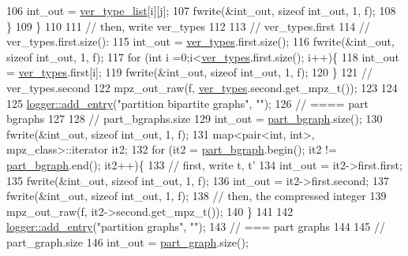 \begin{DoxyCode}
106       int\_out = \hyperlink{classmarked__graph__compressed_af2e3e55223d436628a02758dfae88493}{ver\_type\_list}[i][j];
107       fwrite(&int\_out, \textcolor{keyword}{sizeof} int\_out, 1, f);
108     \}
109   \}
110 
111   \textcolor{comment}{// then, write ver\_types}
112 
113   \textcolor{comment}{// ver\_types.first}
114   \textcolor{comment}{// ver\_types.first.size():}
115   int\_out = \hyperlink{classmarked__graph__compressed_af446cc5e23c241a92b76642fd5ebc403}{ver\_types}.first.size();
116   fwrite(&int\_out, \textcolor{keyword}{sizeof} int\_out, 1, f);
117   \textcolor{keywordflow}{for} (\textcolor{keywordtype}{int} i =0;i<\hyperlink{classmarked__graph__compressed_af446cc5e23c241a92b76642fd5ebc403}{ver\_types}.first.size(); i++)\{
118     int\_out = \hyperlink{classmarked__graph__compressed_af446cc5e23c241a92b76642fd5ebc403}{ver\_types}.first[i];
119     fwrite(&int\_out, \textcolor{keyword}{sizeof} int\_out, 1, f);
120   \}
121   \textcolor{comment}{// ver\_types.second}
122   mpz\_out\_raw(f, \hyperlink{classmarked__graph__compressed_af446cc5e23c241a92b76642fd5ebc403}{ver\_types}.second.get\_mpz\_t());
123 
124 
125   \hyperlink{classlogger_a710163deb17bc81f70d53d285b8ac9ac}{logger::add\_entry}(\textcolor{stringliteral}{"partition bipartite graphs"}, \textcolor{stringliteral}{""});
126   \textcolor{comment}{// ==== part bgraphs}
127 
128   \textcolor{comment}{// part\_bgraphs.size}
129   int\_out = \hyperlink{classmarked__graph__compressed_a7b3267063fba30b45eb21b3ba4e07536}{part\_bgraph}.size();
130   fwrite(&int\_out, \textcolor{keyword}{sizeof} int\_out, 1, f);
131   map<pair<int, int>, mpz\_class>::iterator it2;
132   \textcolor{keywordflow}{for} (it2 = \hyperlink{classmarked__graph__compressed_a7b3267063fba30b45eb21b3ba4e07536}{part\_bgraph}.begin(); it2 != \hyperlink{classmarked__graph__compressed_a7b3267063fba30b45eb21b3ba4e07536}{part\_bgraph}.end(); it2++)\{
133     \textcolor{comment}{// first, write t, t'}
134     int\_out = it2->first.first;
135     fwrite(&int\_out, \textcolor{keyword}{sizeof} int\_out, 1, f);
136     int\_out = it2->first.second;
137     fwrite(&int\_out, \textcolor{keyword}{sizeof} int\_out, 1, f);
138     \textcolor{comment}{// then, the compressed integer}
139     mpz\_out\_raw(f, it2->second.get\_mpz\_t());
140   \}
141 
142   \hyperlink{classlogger_a710163deb17bc81f70d53d285b8ac9ac}{logger::add\_entry}(\textcolor{stringliteral}{"partition graphs"}, \textcolor{stringliteral}{""});
143   \textcolor{comment}{// === part graphs}
144 
145   \textcolor{comment}{// part\_graph.size}
146   int\_out = \hyperlink{classmarked__graph__compressed_ae179a4737e6eab905c18a94d44ef64b7}{part\_graph}.size();

\end{DoxyCode}
